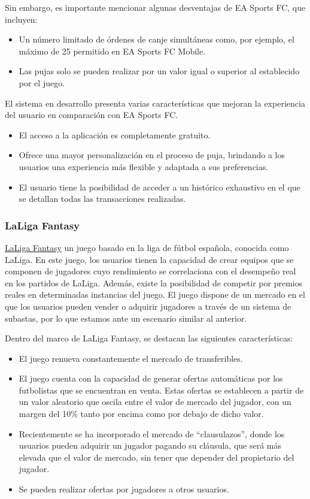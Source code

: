 Sin embargo, es importante mencionar algunas desventajas de EA Sports FC, que incluyen:
\begin{itemize}
    \item Un número limitado de órdenes de canje simultáneas como, por ejemplo, el máximo de 25 permitido en EA Sports FC Mobile.
    \item Las pujas solo se pueden realizar por un valor igual o superior al establecido por el juego. 
\end{itemize}

El sistema en desarrollo presenta varias características que mejoran la experiencia del usuario en comparación con EA Sports FC.

\begin{itemize}
    \item El acceso a la aplicación es completamente gratuito.
    \item Ofrece una mayor personalización en el proceso de puja, brindando a los usuarios una experiencia más flexible y adaptada a sus preferencias.
    \item El usuario tiene la posibilidad de acceder a un histórico exhaustivo en el que se detallan todas las transacciones realizadas.
\end{itemize}

\subsubsection{LaLiga Fantasy}
\href{https://laligafantasy.relevo.com/}{LaLiga Fantasy} un juego basado en la liga de fútbol española, conocida como LaLiga. En este juego, los usuarios tienen la capacidad de crear equipos que se componen de jugadores cuyo rendimiento se correlaciona con el desempeño real en los partidos de LaLiga. Además, existe la posibilidad de competir por premios reales en determinadas instancias del juego.
El juego dispone de un mercado en el que los usuarios pueden vender o adquirir jugadores a través de un sistema de subastas, por lo que estamos ante un escenario similar al anterior.


Dentro del marco de LaLiga Fantasy, se destacan las siguientes características:
\begin{itemize}
    \item El juego renueva constantemente el mercado de transferibles.
    \item El juego cuenta con la capacidad de generar ofertas automáticas por los futbolistas que se encuentran en venta. Estas ofertas se establecen a partir de un valor aleatorio que oscila entre el valor de mercado del jugador, con un margen del 10\% tanto por encima como por debajo de dicho valor.
    \item Recientemente se ha incorporado el mercado de ``clausulazos'', donde los usuarios pueden adquirir un jugador pagando su cláusula, que será más elevada que el valor de mercado, sin tener que depender del propietario del jugador.
    \item Se pueden realizar ofertas por jugadores a otros usuarios.
\end{itemize}

